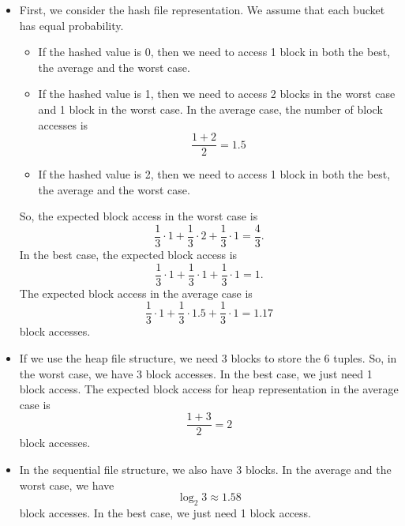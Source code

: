\documentclass[a4paper, openany]{memoir}
\theoremstyle{definition}
\begin{document}
\begin{answer}
    \begin{itemize}
        \item First, we consider the hash file representation. We assume that each bucket has equal probability. 
        \begin{itemize}
            \item If the hashed value is 0, then we need to access 1 block in both the best, the average and the worst case.
            \item If the hashed value is 1, then we need to access 2 blocks in the worst case and 1 block in the worst case. In the average case, the number of block accesses is
            \[\frac{1 + 2}{2} = 1.5\]
            \item If the hashed value is 2, then we need to access 1 block in both the best, the average and the worst case.
        \end{itemize}
        So, the expected block access in the worst case is
        \[\frac{1}{3} \cdot 1 + \frac{1}{3} \cdot 2 + \frac{1}{3} \cdot 1 = \frac{4}{3}.\]
        In the best case, the expected block access is
        \[\frac{1}{3} \cdot 1 + \frac{1}{3} \cdot 1 + \frac{1}{3} \cdot 1 = 1.\]
        The expected block access in the average case is
        \[\frac{1}{3} \cdot 1 + \frac{1}{3} \cdot 1.5 + \frac{1}{3} \cdot 1 = 1.17\]
        block accesses. 
        
        \item If we use the heap file structure, we need 3 blocks to store the 6 tuples. So, in the worst case, we have 3 block accesses. In the best case, we just need 1 block access. The expected block access for heap representation in the average case is
        \[\frac{1 + 3}{2} = 2\]
        block accesses. 
        
        \item In the sequential file structure, we also have 3 blocks. In the average and the worst case, we have 
        \[\log_2 3 \approx 1.58\]
        block accesses. In the best case, we just need 1 block access. 
    \end{itemize}
\end{answer}
\end{document}
